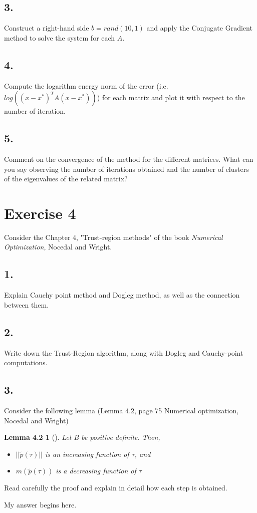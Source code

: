 \documentclass[unicode,11pt,a4paper,oneside,numbers=endperiod,openany]{scrartcl}
\newcommand{\mytheorem}[5]{\newtheorem*{#1}{#2} \begin{#1}[#3]\label{#4} #5 \end{#1}}
\begin{document}
\subsection*{3.}
Construct a right-hand side $b = rand(10,1)$ and apply the Conjugate Gradient method to solve the
system for each $A$.

\subsection*{4.}
Compute the logarithm energy norm of the error (i.e. $log((x - x^*)^T A(x - x^*))$)
for each matrix and plot it with respect to the number of iteration.

\subsection*{5.}
Comment on the convergence of the method for the different matrices.
What can you say observing the number of iterations obtained
and the number of clusters of the eigenvalues of the related matrix?


\section*{Exercise 4}
Consider the Chapter 4, "Trust-region methods" of the book \textit{Numerical Optimization},
Nocedal and Wright.

\subsection*{1.}
Explain  Cauchy point method and Dogleg method, as well as the connection between them.

\subsection*{2.}
Write down the Trust-Region algorithm, along with Dogleg and Cauchy-point computations.

\subsection*{3.}
Consider the following lemma (Lemma 4.2, page 75 Numerical optimization, Nocedal and Wright)

\mytheorem{lemma}{Lemma 4.2}{}{lemma:4.2}{
    Let B be positive definite. Then,
    \begin{itemize}
        \item[(a)] $|| \tilde{p}(\tau) ||$ is an increasing function of $\tau$, and
        \item[(b)] $m(\tilde{p}(\tau))$ is a decreasing function of $\tau$
    \end{itemize}
}

Read carefully the proof and explain in detail how each step is obtained.\\\newline

\noindent
My answer begins here.
\end{document}
